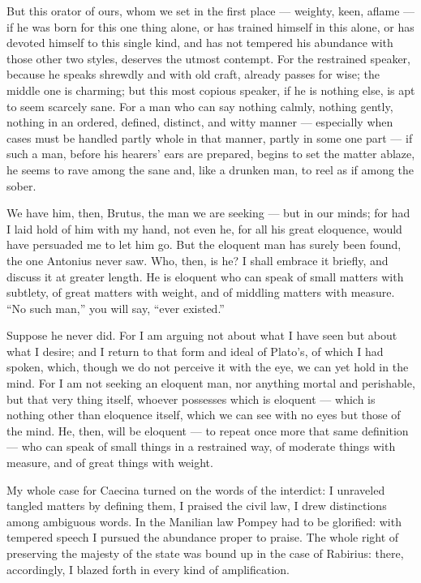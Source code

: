  But this orator of ours, whom we set in the first place — weighty, keen, aflame — if he was born for this one thing alone, or has trained himself in this alone, or has devoted himself to this single kind, and has not tempered his abundance with those other two styles, deserves the utmost contempt. For the restrained speaker, because he speaks shrewdly and with old craft, already passes for wise; the middle one is charming; but this most copious speaker, if he is nothing else, is apt to seem scarcely sane. For a man who can say nothing calmly, nothing gently, nothing in an ordered, defined, distinct, and witty manner — especially when cases must be handled partly whole in that manner, partly in some one part — if such a man, before his hearers' ears are prepared, begins to set the matter ablaze, he seems to rave among the sane and, like a drunken man, to reel as if among the sober.

 We have him, then, Brutus, the man we are seeking — but in our minds; for had I laid hold of him with my hand, not even he, for all his great eloquence, would have persuaded me to let him go. But the eloquent man has surely been found, the one Antonius never saw. Who, then, is he? I shall embrace it briefly, and discuss it at greater length. He is eloquent who can speak of small matters with subtlety, of great matters with weight, and of middling matters with measure. ``No such man,'' you will say, ``ever existed.''

 Suppose he never did. For I am arguing not about what I have seen but about what I desire; and I return to that form and ideal of Plato's, of which I had spoken, which, though we do not perceive it with the eye, we can yet hold in the mind. For I am not seeking an eloquent man, nor anything mortal and perishable, but that very thing itself, whoever possesses which is eloquent — which is nothing other than eloquence itself, which we can see with no eyes but those of the mind. He, then, will be eloquent — to repeat once more that same definition — who can speak of small things in a restrained way, of moderate things with measure, and of great things with weight.

 My whole case for Caecina turned on the words of the interdict: I unraveled tangled matters by defining them, I praised the civil law, I drew distinctions among ambiguous words. In the Manilian law Pompey had to be glorified: with tempered speech I pursued the abundance proper to praise. The whole right of preserving the majesty of the state was bound up in the case of Rabirius: there, accordingly, I blazed forth in every kind of amplification.

